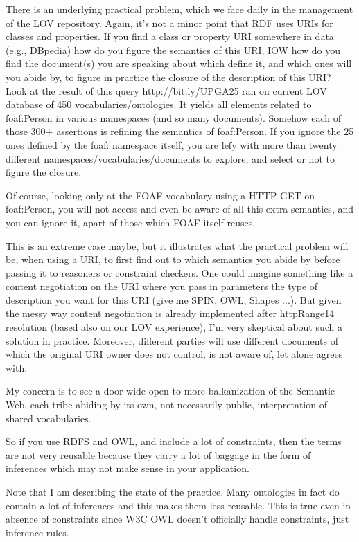 \documentclass{llncs}
\begin{document}
There is an underlying practical problem, which we face daily in the management of the LOV repository.
Again, it's not a minor point that RDF uses URIs for classes and properties. If you find a class or property URI somewhere in data (e.g., DBpedia) how do you figure the semantics of this URI, IOW how do you find the document(s) you are speaking about which define it, and which ones will you abide by, to figure in practice the closure of the description of this URI? 
Look at the result of this query  http://bit.ly/UPGA25  ran on current LOV database of 450 vocabularies/ontologies. It yields all elements related to foaf:Person in various namespaces (and so many documents). Somehow each of those 300+ assertions is refining the semantics of foaf:Person. If you ignore the 25 ones defined by the foaf: namespace itself, you are lefy with more than twenty different namespaces/vocabularies/documents to explore, and select or not to figure the closure.

Of course, looking only at the FOAF vocabulary using a HTTP GET on foaf:Person, you will not access and even be aware of all this extra semantics, and you can ignore it, apart of those which FOAF itself reuses.

This is an extreme case maybe, but it illustrates what the practical problem will be, when using a URI, to first find out to which semantics you abide by before passing it to reasoners or constraint checkers. One could imagine something like a content negotiation on the URI where you pass in parameters the type of description you want for this URI (give me SPIN, OWL, Shapes ...). But given the messy way content negotiation is already implemented after httpRange14 resolution (based also on our LOV experience), I'm very skeptical about such a solution in practice. Moreover, different parties will use different documents of which the original URI owner does not control, is not aware of, let alone agrees with.

My concern is to see a door wide open to more balkanization of the Semantic Web, each tribe abiding by its own, not necessarily public, interpretation of shared vocabularies.

So if you use RDFS and OWL, and include a lot of constraints, then the
terms are not very reusable because they carry a lot of baggage in the
form of inferences which may not make sense in your application.

Note that I am describing the state of the practice. Many ontologies in 
fact do contain a lot of inferences and this makes them less reusable. 
This is true even in absence of constraints since W3C OWL doesn't 
officially handle constraints, just inference rules.
\end{document}
